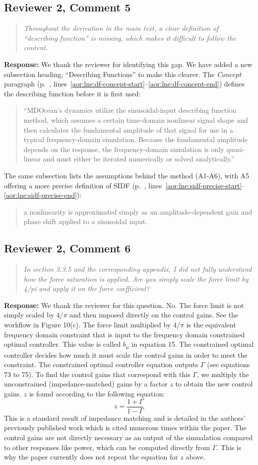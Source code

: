 \documentclass[11pt]{article}
\newcommand{\rcomment}[2]{\subsection*{#1}\begin{quote}\itshape #2\end{quote}}
\newcommand{\response}{\noindent\textbf{Response:} }
\begin{document}
\rcomment{Reviewer 2, Comment 5}{Throughout the derivation in the main text, a clear definition of ``describing function'' is missing, which makes it difficult to follow the content.}
\response We thank the reviewer for identifying this gap.
We have added a new subsection heading,  ``Describing Functions'' to make this clearer.
The \textit{Concept} paragraph (p.~\pageref{aor:lne:df-concept-start}, lines~\ref{aor:lne:df-concept-start}--\ref{aor:lne:df-concept-end}) defines the describing function before it is first used:
\begin{quote}
``MDOcean's dynamics utilize the sinusoidal-input describing function method, which assumes a certain time-domain nonlinear signal shape and then calculates the fundamental amplitude of that signal for use in a typical frequency-domain simulation. Because the fundamental amplitude depends on the response, the frequency-domain simulation is only quasi-linear and must either be iterated numerically or solved analytically.''
\end{quote}
The same subsection lists the assumptions behind the method (A1-A6), with A5 offering a more precise definition of SIDF (p.~\pageref{aor:lne:sidf-precise-start}, lines~\ref{aor:lne:sidf-precise-start}--\ref{aor:lne:sidf-precise-end}):
\begin{quote}
a nonlinearity is approximated simply as an amplitude-dependent gain and phase shift applied to a sinusoidal input.
\end{quote}

\rcomment{Reviewer 2, Comment 6}{In section 3.3.5 and the corresponding appendix, I did not fully understand how the force saturation is applied. Are you simply scale the force limit by 4/pi and apply it on the force coefficient?}
\response We thank the reviewer for this question. 
No. The force limit is not simply scaled by $4/\pi$ and then imposed directly on the control gains.
See the workflow in Figure 10(c).
The force limit multiplied by $4/\pi$ is the equivalent frequency domain constraint that is input to the frequency domain constrained optimal controller.
This value is called $b_\mu$ in equation 15.
The constrained optimal controller decides how much it must scale the control gains in order to meet the constraint.
The constrained optimal controller equation outputs $\Gamma$ (see equations 73 to 75).
To find the control gains that correspond with this $\Gamma$, we multiply the unconstrained (impedance-matched) gains by a factor $z$ to obtain the new control gains.
$z$ is found according to the following equation:
\begin{equation}
  z = \frac{1+\Gamma}{1-\Gamma}
\end{equation}
This is a standard result of impedance matching and is detailed in the authors' previously published work \citet{aor:mccabe_force-limited_2024} which is cited numerous times within the paper.
The control gains are not directly necessary as an output of the simualation compared to other responses like power, which can be computed directly from $\Gamma$.
This is why the paper currently does not repeat the equation for $z$ above.
\end{document}
